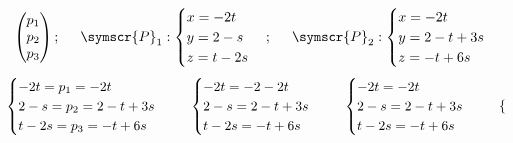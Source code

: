 \documentclass{article}
\def\fancyP{\symscr{P}}
\begin{document}
\begin{enumerate}
\begin{itemize}
\begin{itemize}
\[\begin{pmatrix}
                            p_1 \\ p_2 \\ p_3
                        \end{pmatrix};
                        \hspace{0.5cm}
                        \fancyP_1:
                        \begin{cases}
                            x = -2t \\
                            y = 2 - s \\
                            z = t - 2s
                        \end{cases};
                        \hspace{0.5cm}
                        \fancyP_2:
                        \begin{cases}
                            x = -2t \\
                            y = 2 -t + 3s \\
                            z = -t + 6s
                        \end{cases}
                    \]
                    \[
                        \begin{cases}
                            -2t = p_1 = -2t \\
                            2 - s = p_2 = 2 -t + 3s \\
                            t - 2s = p_3 = -t + 6s
                        \end{cases}
                        \hspace{0.5cm}
                        \begin{cases}
                            -2t = -2 -2t \\
                            2 - s = 2 -t + 3s \\
                            t - 2s = -t + 6s
                        \end{cases}
                        \hspace{0.5cm}
                        \begin{cases}
                            -2t = -2t \\
                            2 - s = 2 -t + 3s \\
                            t - 2s = -t + 6s
                        \end{cases}
                        \hspace{0.5cm}
                        \begin{cases}

\end{cases}\]
\end{itemize}
\end{itemize}
\end{enumerate}
\end{document}
